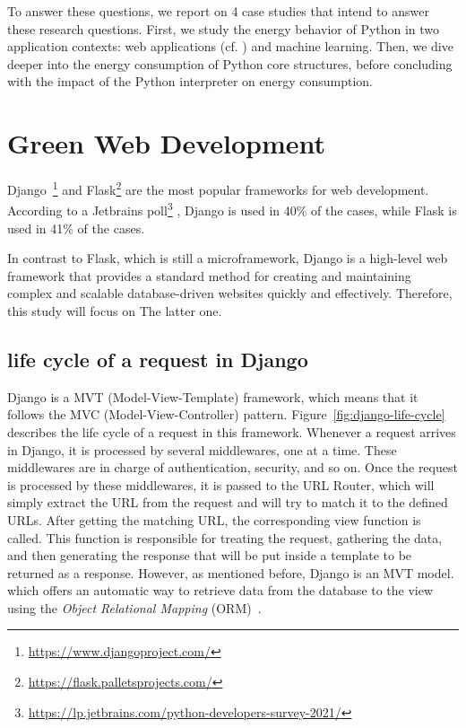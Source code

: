 To answer these questions, we report on 4 case studies that intend to answer these research questions.
First, we study the energy behavior of Python in two application contexts: web applications (cf. ) and machine learning.
Then, we dive deeper into the energy consumption of Python core structures, before concluding with the impact of the Python interpreter on energy consumption.

\section{Green Web Development}\label{sec:webdev}

Django~\footnote{\url{https://www.djangoproject.com/}} and Flask\footnote{\url{https://flask.palletsprojects.com/}}  are the most popular frameworks for web development. According to a Jetbrains poll\footnote{\url{https://lp.jetbrains.com/python-developers-survey-2021/}} , Django is used in 40\% of the cases, while Flask is used in 41\% of the cases.

In contrast to Flask, which is still a microframework, Django is a high-level web framework that provides a standard method for creating and maintaining complex and scalable database-driven websites quickly and effectively. Therefore, this study will focus on The latter one.

\subsection{life cycle of a request in Django}

Django is a MVT (Model-View-Template) framework, which means that it follows the MVC (Model-View-Controller) pattern. Figure~\ref{fig:django-life-cycle} describes the life cycle of a request in this framework.  Whenever a request arrives in Django, it is processed by several middlewares, one at a time. These middlewares are in charge of authentication, security, and so on.
Once the request is processed by these middlewares, it is passed to the URL Router, which will simply extract the URL from the request and will try to match it to the defined URLs.
After getting the matching URL, the corresponding view function is called. This function is responsible for treating the request, gathering the data, and then generating the response that will be put inside a template to be returned as a response.
However, as mentioned before, Django is an MVT model. which offers an automatic way to retrieve data from the database to the view using the \emph{Object Relational Mapping} (ORM)~\cite{o2008object}.

